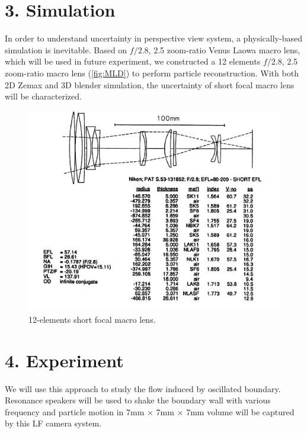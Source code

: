 \documentclass[draftthesis,fullpage]{uiucthesis}
\begin{document}
\section*{3. Simulation}
In order to understand uncertainty in perspective view system, a physically-based simulation is inevitable. Based on $f/2.8$, 2.5 zoom-ratio Venus Laowa macro lens, which will be used in future experiment, we constructed a 12 elements $f/2.8$, 2.5 zoom-ratio macro lens (\autoref{fig:MLD}) \citep{smith2005modern} to perform particle reconstruction. With both 2D Zemax and 3D blender simulation, the uncertainty of short focal macro lens will be characterized. 

\begin{figure}[h]
  \centerline{\includegraphics[width=0.7\linewidth]{fig/modern_lens_design.png}} 
  \caption{12-elements short focal macro lens.}
\label{fig:MLD}
\end{figure}

\section*{4. Experiment}
We will use this approach to study the flow induced by oscillated boundary. Resonance speakers will be used to shake the boundary wall with various frequency and particle motion in 7mm $\times$ 7mm $\times$ 7mm volume will be captured by this LF camera system. 

\newpage

%

\end{document}
